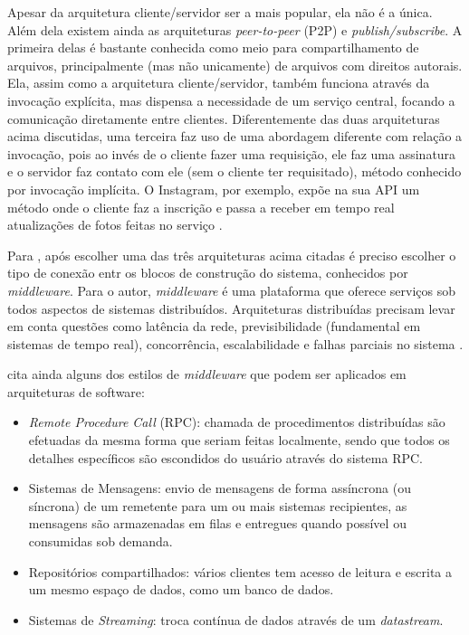 \documentclass[diss]{template/setrem}
\begin{document}
Apesar da arquitetura cliente/servidor ser a mais popular, ela não é a única. Além dela existem ainda as arquiteturas \emph{peer-to-peer} (P2P) e \emph{publish/subscribe}. A primeira delas é bastante conhecida como meio para compartilhamento de arquivos, principalmente (mas não unicamente) de arquivos com direitos autorais. Ela, assim como a arquitetura cliente/servidor, também funciona através da invocação explícita, mas dispensa a necessidade de um serviço central, focando a comunicação diretamente entre clientes. Diferentemente das duas arquiteturas acima discutidas, uma terceira faz uso de uma abordagem diferente com relação a invocação, pois ao invés de o cliente fazer uma requisição, ele faz uma assinatura e o servidor faz contato com ele (sem o cliente ter requisitado), método conhecido por invocação implícita. O Instagram, por exemplo, expõe na sua API um método onde o cliente faz a inscrição e passa a receber em tempo real atualizações de fotos feitas no serviço \citep{Vogel2011}.

Para \citet{Vogel2011}, após escolher uma das três arquiteturas acima citadas é preciso escolher o tipo de conexão entr os blocos de construção do sistema, conhecidos por \emph{middleware}. Para o autor, \emph{middleware} é uma plataforma que oferece serviços sob todos aspectos de sistemas distribuídos. Arquiteturas distribuídas precisam levar em conta questões como latência da rede, previsibilidade (fundamental em sistemas de tempo real), concorrência, escalabilidade e falhas parciais no sistema \citep{Vogel2011}.

\citet{Vogel2011} cita ainda alguns dos estilos de \emph{middleware} que podem ser aplicados em arquiteturas de software:
\begin{itemize}
	\item \emph{Remote Procedure Call} (RPC): chamada de procedimentos distribuídas são efetuadas da mesma forma que seriam feitas localmente, sendo que todos os detalhes específicos são escondidos do usuário através do sistema RPC.
	\item Sistemas de Mensagens: envio de mensagens de forma assíncrona (ou síncrona) de um remetente para um ou mais sistemas recipientes, as mensagens são armazenadas em filas e entregues quando possível ou consumidas sob demanda.
	\item Repositórios compartilhados: vários clientes tem acesso de leitura e escrita a um mesmo espaço de dados, como um banco de dados.
	\item Sistemas de \emph{Streaming}: troca contínua de dados através de um \emph{datastream}.
\end{itemize}
\end{document}

